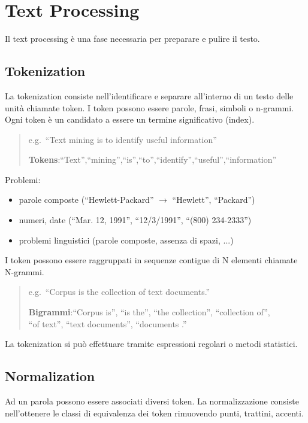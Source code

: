 \chapter{Text Processing}
Il text processing è una fase necessaria per preparare e pulire il testo.

\section{Tokenization}
La tokenization consiste nell'identificare e separare all'interno di un testo delle unità chiamate token.
I token possono essere parole, frasi, simboli o n-grammi. Ogni token è un candidato a essere un termine significativo (index).

\begin{quote}
  e.g.\ ``Text mining is to identify useful information''

  \textbf{Tokens}:``Text'',``mining'',``is'',``to'',``identify'',``useful'',``information''
\end{quote}

Problemi:
\begin{itemize}
  \item parole composte (``Hewlett-Packard'' $\rightarrow$ ``Hewlett'', ``Packard'')
  \item numeri, date (``Mar. 12, 1991'', ``12/3/1991'', ``(800) 234-2333'')
  \item problemi linguistici (parole composte, assenza di spazi, ...)
\end{itemize}

I token possono essere raggruppati in sequenze contigue di N elementi chiamate N-grammi.

\begin{quote}
  e.g.\ ``Corpus is the collection of text documents.''

  \textbf{Bigrammi}:``Corpus is'', ``is the'', ``the collection'', ``collection of'', \\``of text'', ``text documents'', ``documents .''
\end{quote}

La tokenization si può effettuare tramite espressioni regolari o metodi statistici.

\newpage

\section{Normalization}
Ad un parola possono essere associati diversi token. La normalizzazione consiste nell'ottenere le classi di equivalenza dei token rimuovendo punti, trattini, accenti.


